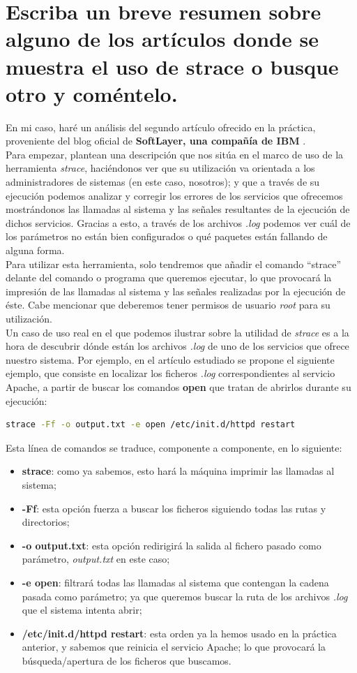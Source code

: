 \section{Escriba un breve resumen sobre alguno de los artículos donde se muestra el uso de strace o busque otro y coméntelo.}
En mi caso, haré un análisis del segundo artículo ofrecido en la práctica, proveniente del blog oficial de \textbf{SoftLayer, una compañía de IBM} \cite{softlayer-strace}. \\
Para empezar, plantean una descripción que nos sitúa en el marco de uso de la herramienta \emph{strace}, haciéndonos ver que su utilización va orientada a los administradores de sistemas (en este caso, nosotros); y que a través de su ejecución podemos analizar y corregir los errores de los servicios que ofrecemos mostrándonos las llamadas al sistema y las señales resultantes de la ejecución de dichos servicios. Gracias a esto, a través de los archivos \emph{.log} podemos ver cuál de los parámetros no están bien configurados o qué paquetes están fallando de alguna forma. \\
Para utilizar esta herramienta, solo tendremos que añadir el comando ``strace'' delante del comando o programa que queremos ejecutar, lo que provocará la impresión de las llamadas al sistema y las señales realizadas por la ejecución de éste. Cabe mencionar que deberemos tener permisos de usuario \emph{root} para su utilización. \\
Un caso de uso real en el que podemos ilustrar sobre la utilidad de \emph{strace} es a la hora de descubrir dónde están los archivos \emph{.log} de uno de los servicios que ofrece nuestro sistema. Por ejemplo, en el artículo estudiado se propone el siguiente ejemplo, que consiste en localizar los ficheros \emph{.log} correspondientes al servicio Apache, a partir de buscar los comandos \textbf{open} que tratan de abrirlos durante su ejecución:
\begin{lstlisting}[language=bash]
	strace -Ff -o output.txt -e open /etc/init.d/httpd restart
\end{lstlisting}
Esta línea de comandos se traduce, componente a componente, en lo siguiente:
\begin{itemize}
	\item \textbf{strace}: como ya sabemos, esto hará la máquina imprimir las llamadas al sistema;
	\item \textbf{-Ff}: esta opción fuerza a buscar los ficheros siguiendo todas las rutas y directorios;
	\item \textbf{-o output.txt}: esta opción redirigirá la salida al fichero pasado como parámetro, \emph{output.txt} en este caso;
	\item \textbf{-e open}: filtrará todas las llamadas al sistema que contengan la cadena pasada como parámetro; ya que queremos buscar la ruta de los archivos \emph{.log} que el sistema intenta abrir;
	\item \textbf{/etc/init.d/httpd restart}: esta orden ya la hemos usado en la práctica anterior, y sabemos que reinicia el servicio Apache; lo que provocará la búsqueda/apertura de los ficheros que buscamos.
\end{itemize}
